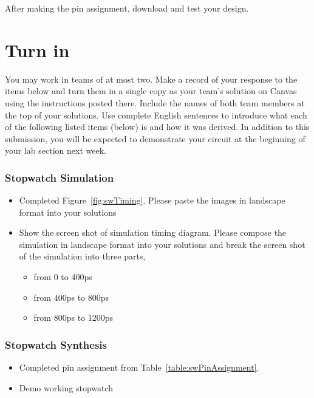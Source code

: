 After making the pin assignment, download and test your design.

\section{Turn in}

You may work in teams of at most two. Make a record of your response to
the items below and turn them in a single copy as your team's solution
on Canvas using the instructions posted there. Include the names of both
team members at the top of your solutions. Use complete English
sentences to introduce what each of the following listed items (below)
is and how it was derived. In addition to this submission, you will be
expected to demonstrate your circuit at the beginning of your lab
section next week.

\subsubsection{Stopwatch Simulation}

\begin{itemize}
\item
  Completed Figure~\ref{fig:swTiming}. Please paste the images in landscape format into your solutions

\item
  Show the screen shot of simulation timing diagram. Please compose the simulation in landscape 
  format into your solutions and break the screen shot of the simulation into three parts,

  \begin{itemize}
    \item
      from 0 to 400ps
    \item
      from 400ps to 800ps
    \item
      from 800ps to 1200ps
\end{itemize}
\end{itemize}

\subsubsection{Stopwatch Synthesis}

\begin{itemize}
\item
  Completed pin assignment from Table~\ref{table:swPinAssignment}.
\item
  Demo working stopwatch
\end{itemize}
